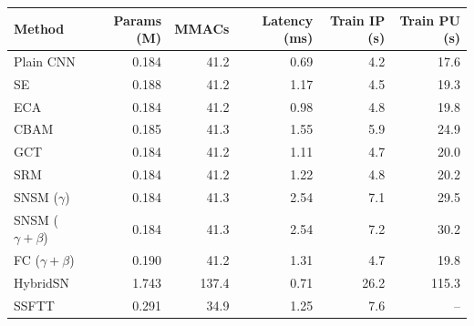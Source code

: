 \begin{tabular}{lrrrrr}
\toprule
Method & Params (M) & MMACs & Latency (ms) & Train IP (s) & Train PU (s) \\
\midrule
Plain CNN & 0.184 & 41.2 & 0.69 & 4.2 & 17.6 \\
SE & 0.188 & 41.2 & 1.17 & 4.5 & 19.3 \\
ECA & 0.184 & 41.2 & 0.98 & 4.8 & 19.8 \\
CBAM & 0.185 & 41.3 & 1.55 & 5.9 & 24.9 \\
GCT & 0.184 & 41.2 & 1.11 & 4.7 & 20.0 \\
SRM & 0.184 & 41.2 & 1.22 & 4.8 & 20.2 \\
SNSM ($\gamma$) & 0.184 & 41.3 & 2.54 & 7.1 & 29.5 \\
SNSM ($\gamma{+}\beta$) & 0.184 & 41.3 & 2.54 & 7.2 & 30.2 \\
FC ($\gamma{+}\beta$) & 0.190 & 41.2 & 1.31 & 4.7 & 19.8 \\
HybridSN & 1.743 & 137.4 & 0.71 & 26.2 & 115.3 \\
SSFTT & 0.291 & 34.9 & 1.25 & 7.6 & -- \\
\bottomrule
\end{tabular}

